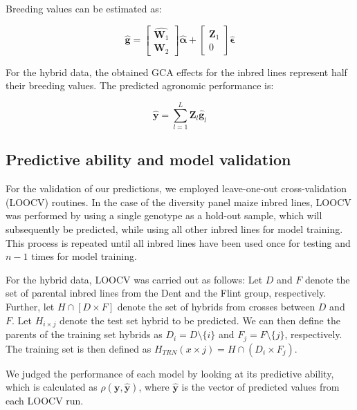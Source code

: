 \documentclass[12pt,titlepage]{article}
\begin{document}
Breeding values can be estimated as:

\begin{equation} \label{eq:breeding-values}
\hat{\mathbf{g}} = 
 \begin{bmatrix}
  \hat{\mathbf{W}_1} \\
  \mathbf{W}_2 
 \end{bmatrix}
 \hat{\boldsymbol{\alpha}}
 + 
 \begin{bmatrix}
  \mathbf{Z}_1 \\
  0
 \end{bmatrix}
 \hat{\boldsymbol{\epsilon}} 
\end{equation}

For the hybrid data, the obtained GCA effects for the inbred lines represent 
half their breeding values.
The predicted agronomic performance is:

\begin{equation} \label{eq:predicted-performance}
\hat{\mathbf{y}} = \sum_{l=1}^{L} \mathbf{Z}_{l}\hat{\mathbf{g}}_{l} 
\end{equation}


\subsection{Predictive ability and model validation}
For the validation of our predictions, we employed leave-one-out
cross-validation (LOOCV) routines.
In the case of the diversity panel maize inbred lines, LOOCV was performed by 
using a single genotype as a hold-out sample, which will subsequently be 
predicted, while using all other inbred lines for model training.
This process is repeated until all inbred lines have been used once for testing
and $n - 1$ times for model training.

For the hybrid data, LOOCV was carried out as follows:
Let $D$ and $F$ denote the set of parental inbred lines from the Dent and the 
Flint group, respectively.
Further, let $H \cap [D \times F]$ denote the set of hybrids from crosses 
between $D$ and $F$.
Let $H_{i \times j}$ denote the test set hybrid to be predicted.
We can then define the parents of the training set hybrids as
$D_{i} = D \setminus \{i\}$ and $F_{j} = F \setminus \{j\}$, respectively.
The training set is then defined as 
$H_{TRN}(x \times j) = H \cap (D_{i} \times F_{j})$.

We judged the performance of each model by looking at its predictive ability,
which is calculated as $\rho(\mathbf{y}, \mathbf{\hat{y}})$, where 
$\mathbf{\hat{y}}$ is the vector of predicted values from each LOOCV run.
\end{document}

